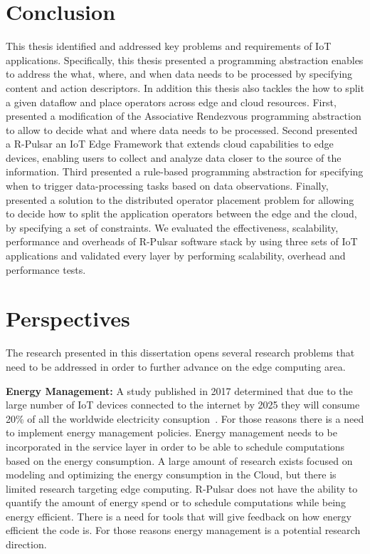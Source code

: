 \section{Conclusion}
This thesis identified and addressed key problems and requirements of IoT applications. Specifically, this thesis presented a programming abstraction enables to address the what, where, and when data needs to be processed by specifying content and action descriptors. In addition this thesis also tackles the how to split a given dataflow and place operators across edge and cloud resources. First, presented a modification of the Associative Rendezvous programming abstraction to allow to decide what and where data needs to be processed. Second presented a R-Pulsar an IoT Edge Framework that extends cloud capabilities to edge devices, enabling users to collect and analyze data closer to the source of the information. Third presented a rule-based programming abstraction for specifying when to trigger data-processing tasks based on data observations. Finally, presented a solution to the distributed operator placement problem for allowing to decide how to split the application operators between the edge and the cloud, by specifying a set of constraints. We evaluated the effectiveness, scalability, performance and overheads of R-Pulsar software stack by using three sets of IoT applications and validated every layer by performing scalability, overhead and performance tests.

\section{Perspectives}
The research presented in this dissertation opens several research problems that need to be addressed in order to further advance on the edge computing area.

\textbf{Energy Management:} A study published in 2017 determined that due to the large number of IoT devices connected to the internet by 2025 they will consume 20\% of all the worldwide electricity consuption~\cite{Energy}. For those reasons there is a need to implement energy management policies.  Energy management needs to be incorporated in the service layer in order to be able to schedule computations based on the energy consumption. A large amount of research exists focused on modeling and optimizing the energy consumption in the Cloud, but there is limited research targeting edge computing.  R-Pulsar does not have the ability to quantify the amount of energy spend or to schedule computations while being energy efficient. There is a need for tools that will give feedback on how energy efficient the code is. For those reasons energy management is a potential research direction.

